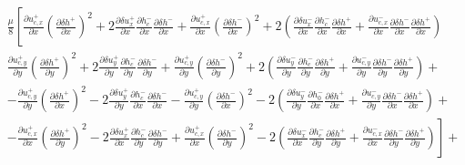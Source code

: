 \documentclass[aps,prx,10pt,twocolumn,superscriptaddress]{revtex4}
\begin{document}
\begin{widetext}
\begin{align}
&\frac{\mu}{8}\left[ \frac{\partial u^{+}_{c,x}}{\partial x} \left( \frac{\partial \delta h^{+}}{\partial x}\right)^2 +2\frac{\partial \delta u^{+}_{x}}{\partial x}  \frac{\partial h^{-}_{c}}{\partial x}\frac{\partial \delta h^{-}}{\partial x}+  \frac{\partial u^{+}_{c,x}}{\partial x} \left( \frac{\partial \delta h^{-}}{\partial x}\right)^2 +2\left( \frac{\partial \delta u^{-}_{x}}{\partial x}  \frac{\partial h^{-}_{c}}{\partial x}\frac{\partial \delta h^{+}}{\partial x} +\frac{\partial u^{-}_{c,x}}{\partial x}  \frac{\partial\delta  h^{-}}{\partial x}\frac{\partial \delta h^{+}}{\partial x} \right)  \right.\nonumber \\
&\frac{\partial u^{+}_{c,y}}{\partial y} \left( \frac{\partial \delta h^{+}}{\partial y}\right)^2 +2\frac{\partial \delta u^{+}_{y}}{\partial y}  \frac{\partial h^{-}_{c}}{\partial y}\frac{\partial \delta h^{-}}{\partial y}+  \frac{\partial u^{+}_{c,y}}{\partial y} \left( \frac{\partial \delta h^{-}}{\partial y}\right)^2 +2\left( \frac{\partial \delta u^{-}_{y}}{\partial y}  \frac{\partial h^{-}_{c}}{\partial y}\frac{\partial \delta h^{+}}{\partial y} +\frac{\partial u^{-}_{c,y}}{\partial y}  \frac{\partial\delta  h^{-}}{\partial y}\frac{\partial \delta h^{+}}{\partial y} \right) +\nonumber\\
&-\frac{\partial u^{+}_{c,y}}{\partial y} \left( \frac{\partial \delta h^{+}}{\partial x}\right)^2 -2\frac{\partial \delta u^{+}_{y}}{\partial y}  \frac{\partial h^{-}_{c}}{\partial x}\frac{\partial \delta h^{-}}{\partial x}-  \frac{\partial u^{+}_{c,y}}{\partial y} \left( \frac{\partial \delta h^{-}}{\partial x}\right)^2 -2\left( \frac{\partial \delta u^{-}_{y}}{\partial y}  \frac{\partial h^{-}_{0}}{\partial x}\frac{\partial \delta h^{+}}{\partial x} +\frac{\partial u^{-}_{c,y}}{\partial y}  \frac{\partial\delta  h^{-}}{\partial x}\frac{\partial \delta h^{+}}{\partial x} \right) +\nonumber\\
&\left. -\frac{\partial u^{+}_{c,x}}{\partial x} \left( \frac{\partial \delta h^{+}}{\partial y}\right)^2 -2\frac{\partial \delta u^{+}_{x}}{\partial x}  \frac{\partial h^{-}_{c}}{\partial y}\frac{\partial \delta h^{-}}{\partial y}+  \frac{\partial u^{+}_{c,x}}{\partial x} \left( \frac{\partial \delta h^{-}}{\partial y}\right)^2 -2\left( \frac{\partial \delta u^{-}_{x}}{\partial x}  \frac{\partial h^{-}_{c}}{\partial y}\frac{\partial \delta h^{+}}{\partial y} +\frac{\partial u^{-}_{c,x}}{\partial x}  \frac{\partial\delta  h^{-}}{\partial y}\frac{\partial \delta h^{+}}{\partial y} \right) \right]+\nonumber\\

\end{align}
\end{widetext}
\end{document}
